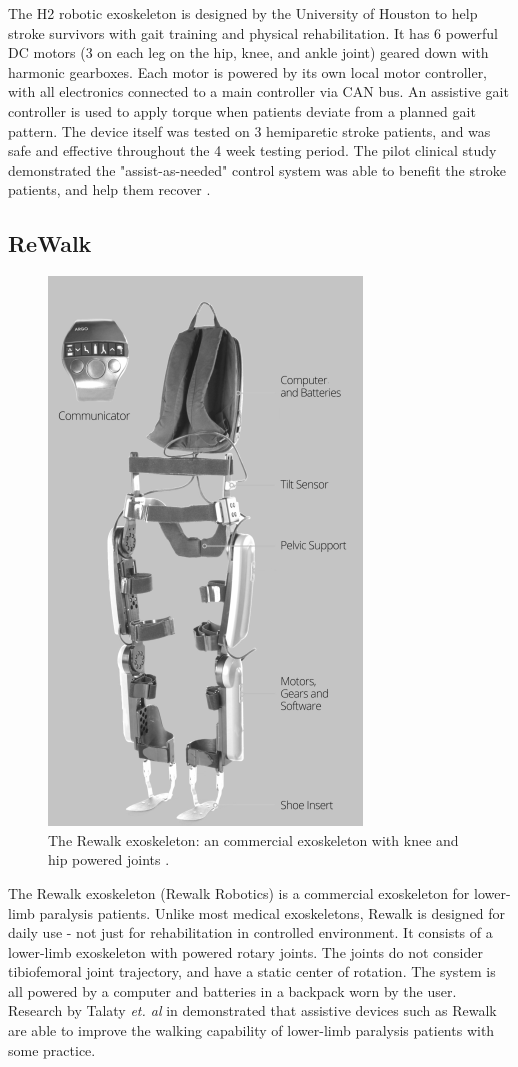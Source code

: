 The H2 robotic exoskeleton is designed by the University of Houston to help stroke survivors with gait training and physical rehabilitation. It has 6 powerful DC motors (3 on each leg on the hip, knee, and ankle joint) geared down with harmonic gearboxes. Each motor is powered by its own local motor controller, with all electronics connected to a main controller via CAN bus. An assistive gait controller is used to apply torque when patients deviate from a planned gait pattern. The device itself was tested on 3 hemiparetic stroke patients, and was safe and effective throughout the 4 week testing period. The pilot clinical study demonstrated the "assist-as-needed" control system was able to benefit the stroke patients, and help them recover \cite{ExoH2}.

\subsection{ReWalk}
\begin{figure}[H]
    \centering
    \includegraphics[width=0.4\linewidth]{Figures/Background/OtherExos/ReWalk.png}
    \caption{The Rewalk exoskeleton: an commercial exoskeleton with knee and hip powered joints \cite{ExoRewalk}.}
    \label{fig:RewalkExo}
\end{figure}

The {Rewalk\texttrademark} exoskeleton (Rewalk Robotics) is a commercial exoskeleton for lower-limb paralysis patients. Unlike most medical exoskeletons, Rewalk is designed for daily use - not just for rehabilitation in controlled environment. It consists of a lower-limb exoskeleton with powered rotary joints. The joints do not consider tibiofemoral joint trajectory, and have a static center of rotation. The system is all powered by a computer and batteries in a backpack worn by the user. Research by Talaty \textit{et. al} in \cite{ExoRewalk} demonstrated that assistive devices such as Rewalk are able to improve the walking capability of lower-limb paralysis patients with some practice. 

